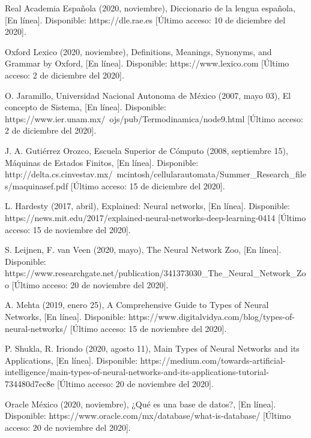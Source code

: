 \documentclass[12pt, a4paper, titlepage]{report}
\begin{document}
    \begin{thebibliography}{20}
		Real Academia Española (2020, noviembre), Diccionario de la lengua española, [En línea]. Disponible: https://dle.rae.es [Último acceso: 10 de diciembre del 2020].

		Oxford Lexico (2020, noviembre), Definitions, Meanings, Synonyms, and Grammar by Oxford, [En línea]. Disponible: https://www.lexico.com [Último acceso: 2 de diciembre del 2020].

		O. Jaramillo, Universidad Nacional Autonoma de México (2007, mayo 03), El concepto de Sistema, [En línea]. Disponible: https://www.ier.unam.mx/~ojs/pub/Termodinamica/node9.html [Último acceso: 2 de diciembre del 2020].

		J. A. Gutiérrez Orozco, Escuela Superior de Cómputo (2008, septiembre 15), Máquinas de Estados Finitos, [En línea]. Disponible: http://delta.cs.cinvestav.mx/~mcintosh/cellularautomata/Summer\_Research\_files/maquinasef.pdf [Último acceso: 15 de diciembre del 2020].

		L. Hardesty  (2017, abril), Explained: Neural networks, [En línea]. Disponible: https://news.mit.edu/2017/explained-neural-networks-deep-learning-0414 [Último acceso: 15 de noviembre del 2020].

		S. Leijnen, F. van Veen (2020, mayo), The Neural Network Zoo, [En línea]. Disponible: https://www.researchgate.net/publication/341373030\_The\_Neural\_Network\_Zoo [Último acceso: 20 de noviembre del 2020].

		A. Mehta (2019, enero 25), A Comprehensive Guide to Types of Neural Networks, [En línea]. Disponible: https://www.digitalvidya.com/blog/types-of-neural-networks/ [Último acceso: 15 de noviembre del 2020].

		P. Shukla, R. Iriondo (2020, agosto 11), Main Types of Neural Networks and its Applications, [En línea]. Disponible: https://medium.com/towards-artificial-intelligence/main-types-of-neural-networks-and-its-applications-tutorial-734480d7ec8e [Último acceso: 20 de noviembre del 2020].

		Oracle México (2020, noviembre), ¿Qué es una base de datos?, [En línea]. Disponible: https://www.oracle.com/mx/database/what-is-database/ [Último acceso: 20 de noviembre del 2020].


\end{thebibliography}
\end{document}
